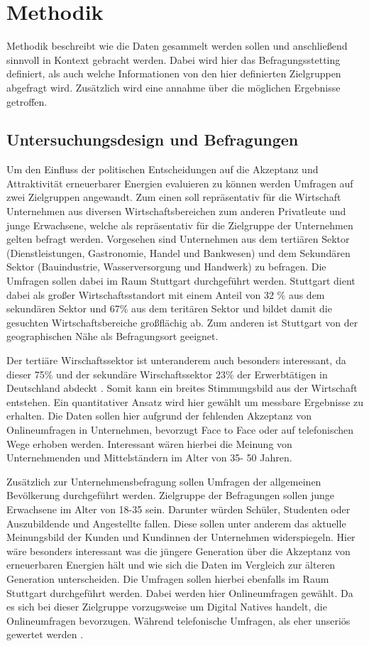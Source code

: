 \documentclass[12pt,a4paper]{article}
\begin{document}
\section*{Methodik}
Methodik beschreibt wie die Daten gesammelt werden sollen und anschließend sinnvoll in Kontext gebracht werden.
Dabei wird hier das Befragungsstetting definiert, als auch welche Informationen von den hier definierten Zielgruppen
abgefragt wird. Zusätzlich wird eine annahme über die möglichen Ergebnisse getroffen.
\subsection*{Untersuchungsdesign und Befragungen }
Um den Einfluss der politischen Entscheidungen auf die Akzeptanz und Attraktivität 
erneuerbarer Energien evaluieren zu können werden Umfragen auf zwei Zielgruppen angewandt. 
Zum einen soll repräsentativ für die Wirtschaft Unternehmen aus diversen Wirtschaftsbereichen 
zum anderen Privatleute und junge Erwachsene, welche als repräsentativ für die Zielgruppe der Unternehmen 
gelten befragt werden. Vorgesehen sind Unternehmen aus dem tertiären Sektor 
(Dienstleistungen, Gastronomie, Handel und Bankwesen) und dem Sekundären Sektor
(Bauindustrie, Wasserversorgung und Handwerk)  zu befragen. 
Die Umfragen sollen dabei im Raum Stuttgart durchgeführt werden. Stuttgart dient dabei als großer 
Wirtschaftsstandort mit einem Anteil von 32 \% aus dem sekundären Sektor und 67\% aus 
dem teritären Sektor \autocite{stuttgart:2023} und bildet damit die gesuchten Wirtschaftsbereiche großflächig ab. 
Zum anderen ist Stuttgart von der geographischen Nähe als Befragungsort geeignet.

Der tertiäre Wirschaftssektor ist unteranderem auch besonders interessant,
da dieser 75\% und der sekundäre Wirschaftssektor 23\% der Erwerbtätigen in Deutschland
abdeckt \autocite{workers:2022}. 
Somit kann ein breites Stimmungsbild aus der Wirtschaft entstehen. 
Ein quantitativer Ansatz wird hier gewählt um messbare Ergebnisse zu erhalten. 
Die Daten sollen hier aufgrund der fehlenden Akzeptanz von Onlineumfragen in Unternehmen, 
bevorzugt Face to Face oder auf telefonischen Wege erhoben werden.
Interessant wären hierbei die Meinung von Unternehmenden und Mittelständern im Alter von 35- 50 Jahren.

Zusätzlich zur Unternehmensbefragung sollen Umfragen der allgemeinen Bevölkerung durchgeführt werden. 
Zielgruppe der Befragungen sollen junge Erwachsene im Alter von 18-35 sein. Darunter würden Schüler, 
Studenten oder Auszubildende und Angestellte fallen. Diese sollen unter anderem das aktuelle Meinungsbild 
der Kunden und Kundinnen der Unternehmen widerspiegeln. Hier wäre besonders interessant was die jüngere Generation 
über die Akzeptanz von erneuerbaren Energien hält und wie sich die Daten im Vergleich zur älteren Generation unterscheiden. 
Die Umfragen sollen hierbei ebenfalls im Raum Stuttgart durchgeführt werden. Dabei werden hier Onlineumfragen gewählt.
Da es sich bei dieser Zielgruppe vorzugsweise um Digital Natives handelt, die Onlineumfragen bevorzugen.
Während telefonische Umfragen, als eher unseriös gewertet werden \autocite{umfrage:2019}. 
\end{document}
